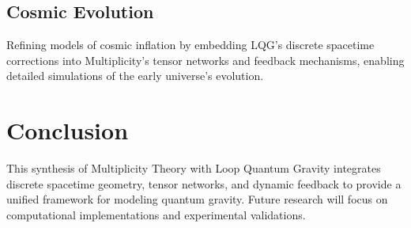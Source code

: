 \documentclass{article}
\theoremstyle{plain}
\begin{document}
\subsection{Cosmic Evolution}
Refining models of cosmic inflation by embedding LQG's discrete spacetime corrections into Multiplicity's tensor networks and feedback mechanisms, enabling detailed simulations of the early universe's evolution.

\section{Conclusion}
This synthesis of Multiplicity Theory with Loop Quantum Gravity integrates discrete spacetime geometry, tensor networks, and dynamic feedback to provide a unified framework for modeling quantum gravity. Future research will focus on computational implementations and experimental validations.


\nocite{*}


\end{document}
